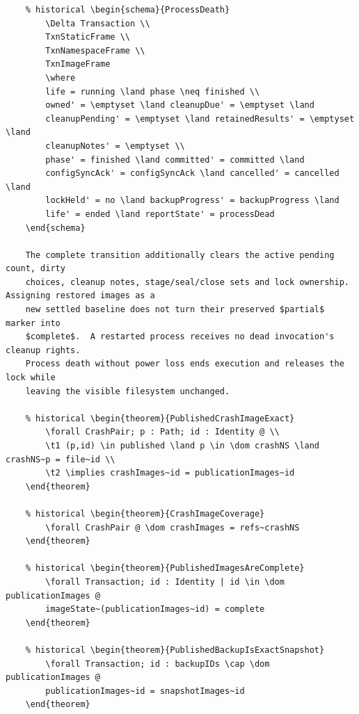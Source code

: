 \documentclass{article}
\makeatletter
\newenvironment{theorem}[1]{\medskip\noindent\textbf{Theorem (#1).}\@nameuse{zed}}{\@nameuse{endzed}}
\makeatother
\begin{document}
\begin{verbatim}
	% historical \begin{schema}{ProcessDeath}
		\Delta Transaction \\
		TxnStaticFrame \\
		TxnNamespaceFrame \\
		TxnImageFrame
		\where
		life = running \land phase \neq finished \\
		owned' = \emptyset \land cleanupDue' = \emptyset \land
		cleanupPending' = \emptyset \land retainedResults' = \emptyset \land
		cleanupNotes' = \emptyset \\
		phase' = finished \land committed' = committed \land
		configSyncAck' = configSyncAck \land cancelled' = cancelled \land
		lockHeld' = no \land backupProgress' = backupProgress \land
		life' = ended \land reportState' = processDead
	\end{schema}

	The complete transition additionally clears the active pending count, dirty
	choices, cleanup notes, stage/seal/close sets and lock ownership.  Assigning restored images as a
	new settled baseline does not turn their preserved $partial$ marker into
	$complete$.  A restarted process receives no dead invocation's cleanup rights.
	Process death without power loss ends execution and releases the lock while
	leaving the visible filesystem unchanged.

	% historical \begin{theorem}{PublishedCrashImageExact}
		\forall CrashPair; p : Path; id : Identity @ \\
		\t1 (p,id) \in published \land p \in \dom crashNS \land crashNS~p = file~id \\
		\t2 \implies crashImages~id = publicationImages~id
	\end{theorem}

	% historical \begin{theorem}{CrashImageCoverage}
		\forall CrashPair @ \dom crashImages = refs~crashNS
	\end{theorem}

	% historical \begin{theorem}{PublishedImagesAreComplete}
		\forall Transaction; id : Identity | id \in \dom publicationImages @
		imageState~(publicationImages~id) = complete
	\end{theorem}

	% historical \begin{theorem}{PublishedBackupIsExactSnapshot}
		\forall Transaction; id : backupIDs \cap \dom publicationImages @
		publicationImages~id = snapshotImages~id
	\end{theorem}


\end{verbatim}
\end{document}

